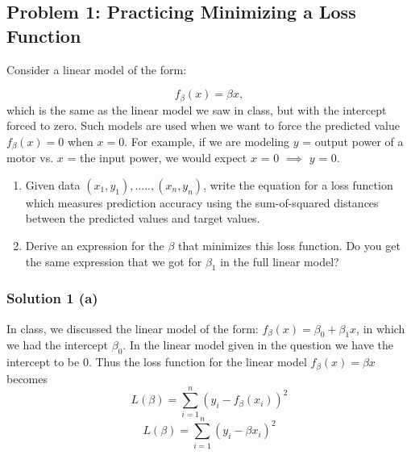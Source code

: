 \documentclass{assignment}
\date{\today}                                   %
\begin{document}
\begin{problem}

\section{Problem 1: Practicing Minimizing a Loss Function}

\noindent Consider a linear model of the form:

\begin{equation}\label{eq:Equation}
     f_\beta(x) = \beta x,
\end{equation}
which is the same as the linear model we saw in class, but with the intercept forced to zero. Such models are used when we want to force the predicted value $f_\beta(x) = 0$ when $x = 0$. For example, if we are modeling $y$ = output power of a motor vs. $x$ = the input power, we would expect $x$ = 0 $\implies$  $y$ = 0.
\begin{enumerate}[label=(\alph*)]
\item Given data $(x_1,y_1 ),.....,(x_n,y_n )$, write the equation for a loss function which measures prediction accuracy using the sum-of-squared distances between the predicted values and target values.

\item Derive an expression for the $\beta$ that minimizes this loss function. Do you get the same expression that
we got for $\beta_1$
in the full linear model?

\end{enumerate}


\subsubsection*{Solution 1 (a)}

\noindent In class, we discussed the linear model of the form: 
     $f_\beta(x) = \beta_0 + \beta_1 x$, 
in which we had the intercept $\beta_0$. 
In the linear model given in the question we have the intercept to be 0. Thus the loss function for the linear model $f_\beta(x) = \beta x$ becomes 
\begin{equation}\label{eq:Equation}
     L(\beta) = \sum_{i=1}^{n} (y_i - f_\beta(x_i))^2
\end{equation}
\begin{equation}\label{eq:Equation}
     L(\beta) = \sum_{i=1}^{n} (y_i -  \beta x_i)^2
\end{equation}


\end{problem}
\end{document}
